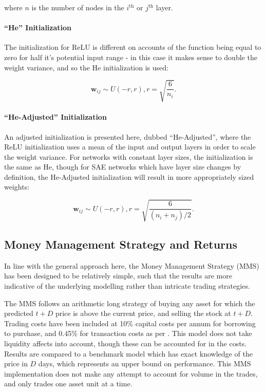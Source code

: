\documentclass[a4paper,11pt,oneside]{article}
\theoremstyle{plain}
\theoremstyle{definition}
\begin{document}
	where $n$ is the number of nodes in the $i^{\mathrm{th}}$ or $j^{\mathrm{th}}$ layer.
	\newline\newline
	\paragraph{``He'' Initialization} The initialization for ReLU is different on accounts of the function being equal to zero for half it's potential input range - in this case it makes sense to double the weight variance, and so the He \citep{He} initialization is used:
	
	\begin{equation}
	\mathbf{w}_{ij} \sim U(-r, r), r = \sqrt{\frac{6}{n_i}} .
	\end{equation}
	
	
	\paragraph{``He-Adjusted'' Initialization} An adjusted initialization is presented here, dubbed ``He-Adjusted'', where the ReLU initialization uses a mean of the input and output layers in order to scale the weight variance. For networks with constant layer sizes, the initialization is the same as He, though for SAE networks which have layer size changes by definition, the He-Adjusted initialization will result in more appropriately sized weights:
	
	\begin{equation}
	\mathbf{w}_{ij} \sim U(-r, r), r = \sqrt{\frac{6}{(n_i + n_j)/2}} .
	\end{equation}
	
	
	\subsection{Money Management Strategy and Returns}\label{imp_mms}
	
	In line with the general approach here, the Money Management Strategy (MMS) has been designed to be relatively simple, such that the results are more indicative of the underlying modelling rather than intricate trading strategies. \newline
	
	The MMS follows an arithmetic long strategy of buying any asset for which the predicted ${t+D}$ price is above the current price, and selling the stock at ${t+D}$. Trading costs have been included at 10\% capital costs per annum for borrowing to purchase, and 0.45\% for transaction costs as per \citep{Loonat}. This model does not take liquidity affects into account, though these can be accounted for in the costs. Results are compared to a benchmark model which has exact knowledge of the price in $D$ days, which represents an upper bound on performance. This MMS implementation does not make any attempt to account for volume in the trades, and only trades one asset unit at a time.
	\hfill\break
	
\end{document}
